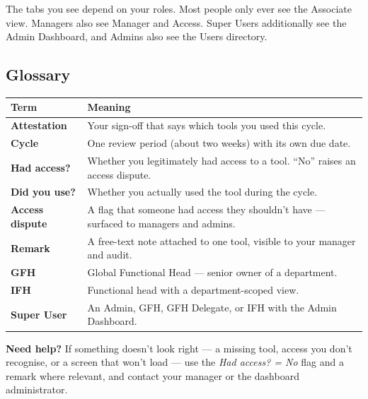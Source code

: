 \documentclass[11pt]{article}
\begin{document}
\begin{notebox}
\faInfoCircle\; The tabs you see depend on your roles. Most people only ever see
the Associate view. Managers also see Manager and Access. Super Users additionally
see the Admin Dashboard, and Admins also see the Users directory.
\end{notebox}

\subsection{Glossary}
\begin{longtable}{>{\raggedright}p{3.6cm} p{10.9cm}}
\toprule
\textbf{Term} & \textbf{Meaning} \\
\midrule
\endhead
\textbf{Attestation} & Your sign-off that says which tools you used this cycle. \\
\textbf{Cycle} & One review period (about two weeks) with its own due date. \\
\textbf{Had access?} & Whether you legitimately had access to a tool. ``No'' raises an access dispute. \\
\textbf{Did you use?} & Whether you actually used the tool during the cycle. \\
\textbf{Access dispute} & A flag that someone had access they shouldn't have --- surfaced to managers and admins. \\
\textbf{Remark} & A free-text note attached to one tool, visible to your manager and audit. \\
\textbf{GFH} & Global Functional Head --- senior owner of a department. \\
\textbf{IFH} & Functional head with a department-scoped view. \\
\textbf{Super User} & An Admin, GFH, GFH Delegate, or IFH with the Admin Dashboard. \\
\bottomrule
\end{longtable}

\vspace{8pt}
\begin{tipbox}
\faLifeRing\; \textbf{Need help?} If something doesn't look right --- a missing tool,
access you don't recognise, or a screen that won't load --- use the
\emph{Had access? = No} flag and a remark where relevant, and contact your manager
or the dashboard administrator.
\end{tipbox}
\end{document}
